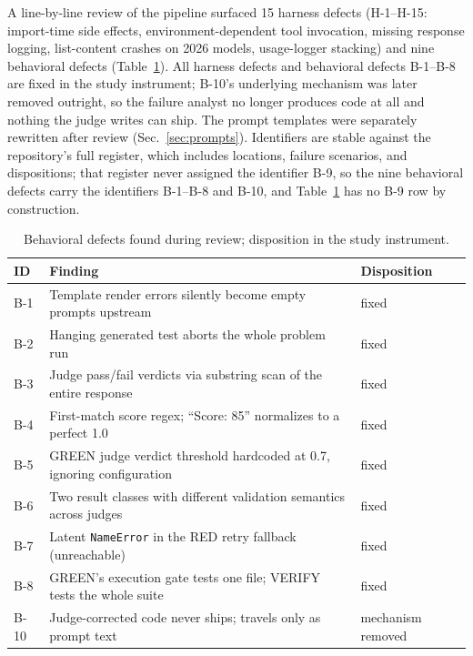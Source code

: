 \documentclass{article}
\begin{document}
A line-by-line review of the pipeline surfaced 15 harness defects (H-1--H-15: import-time
side effects, environment-dependent tool invocation, missing response logging, list-content
crashes on 2026 models, usage-logger stacking) and nine behavioral defects
(Table~\ref{tab:register}). All harness defects and behavioral defects B-1--B-8 are fixed in
the study instrument; B-10's underlying mechanism was later removed outright, so the failure
analyst no longer produces code at all and nothing the judge writes can ship. The
prompt templates were separately rewritten after review (Sec.~\ref{sec:prompts}). Identifiers are stable against the
repository's full register, which includes locations, failure scenarios, and dispositions;
that register never assigned the identifier B-9, so the nine behavioral defects carry the
identifiers B-1--B-8 and B-10, and Table~\ref{tab:register} has no B-9 row by construction.

\begin{table}[h]
\centering
\caption{Behavioral defects found during review; disposition in the study instrument.}
\label{tab:register}
\small
\begin{tabular}{lll}
\toprule
ID & Finding & Disposition \\
\midrule
B-1 & Template render errors silently become empty prompts upstream & fixed \\
B-2 & Hanging generated test aborts the whole problem run & fixed \\
B-3 & Judge pass/fail verdicts via substring scan of the entire response & fixed \\
B-4 & First-match score regex; ``Score: 85'' normalizes to a perfect 1.0 & fixed \\
B-5 & GREEN judge verdict threshold hardcoded at 0.7, ignoring configuration & fixed \\
B-6 & Two result classes with different validation semantics across judges & fixed \\
B-7 & Latent \texttt{NameError} in the RED retry fallback (unreachable) & fixed \\
B-8 & GREEN's execution gate tests one file; VERIFY tests the whole suite & fixed \\
B-10 & Judge-corrected code never ships; travels only as prompt text & mechanism removed \\
\bottomrule
\end{tabular}
\end{table}
\end{document}
